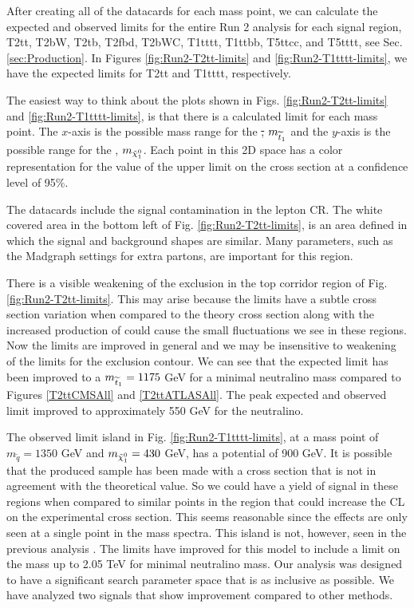 After creating all of the datacards for each mass point, we can calculate the expected and observed limits for the entire Run 2 analysis for each signal region, T2tt, T2bW, T2tb, T2fbd, T2bWC, T1tttt, T1ttbb, T5ttcc, and T5tttt, see Sec. \ref{sec:Production}. In Figures \ref{fig:Run2-T2tt-limits} and \ref{fig:Run2-T1tttt-limits}, we have the expected limits for T2tt and T1tttt, respectively. 

The easiest way to think about the plots shown in Figs. \ref{fig:Run2-T2tt-limits} and \ref{fig:Run2-T1tttt-limits}, is that there is a calculated limit for each mass point. The $x$-axis is the possible mass range for the \st, $m_{\widetilde{t}_1}$ and the $y$-axis is the possible range for the \neutralino, $m_{\tilde{\chi}^{0}_{1}}$. Each point in this 2D space has a color representation for the value of the upper limit on the cross section at a confidence level of 95\%. 

The datacards include the signal contamination in the lepton CR. The white covered area in the bottom left of Fig. \ref{fig:Run2-T2tt-limits}, is an area defined in which the signal and background shapes are similar. Many parameters, such as the Madgraph settings for extra partons, are important for this region.

There is a visible weakening of the exclusion in the top corridor region of Fig. \ref{fig:Run2-T2tt-limits}. This may arise because the limits have a subtle cross section variation when compared to the theory cross section along with the increased production of \ttbar{} could cause the small fluctuations we see in these regions. Now the limits are improved in general and we may be insensitive to weakening of the limits for the exclusion contour. We can see that the expected limit has been improved to a $m_{\widetilde{t}_1}=1175$ GeV for a minimal neutralino mass compared to Figures \ref{T2ttCMSAll} and \ref{T2ttATLASAll}. The peak expected and observed limit improved to approximately 550 GeV for the neutralino. 

The observed limit island in Fig. \ref{fig:Run2-T1tttt-limits}, at a mass point of $m_{\widetilde{q}}=1350$ GeV and $m_{\tilde{\chi}^{0}_{1}}=430$ GeV, has a potential \met{} of 900 GeV. It is possible that the produced sample has been made with a cross section that is not in agreement with the theoretical value. So we could have a yield of signal in these regions when compared to similar points in the region that could increase the CL on the experimental cross section. This seems reasonable since the effects are only seen at a single point in the mass spectra. This island is not, however, seen in the previous analysis \cite{cms_collaboration_search_2018}. The limits have improved for this model to include a limit on the mass up to 2.05 TeV for minimal neutralino mass. Our analysis was designed to have a significant search parameter space that is as inclusive as possible. We have analyzed two signals that show improvement compared to other methods. 
